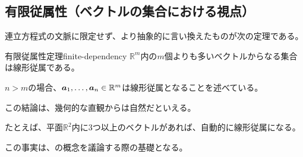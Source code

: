 \documentclass[../../../topic_linear-algebra]{subfiles}
\begin{document}
\subsection{有限従属性（ベクトルの集合における視点）}

連立方程式の文脈に限定せず、より抽象的に言い換えたものが次の定理である。

\begin{theorem}{有限従属性定理}{finite-dependency}
  $\mathbb{R}^m$内の$m$個よりも多いベクトルからなる集合は線形従属である。
\end{theorem}

$n > m$の場合、$\vb*{a}_1, \dots, \vb*{a}_n \in \mathbb{R}^m$は線形従属となることを述べている。

\br

この結論は、幾何的な直観からは自然だといえる。

たとえば、平面$\mathbb{R}^2$内に3つ以上のベクトルがあれば、自動的に線形従属になる。

\br

この事実は、の概念を議論する際の基礎となる。
\end{document}
